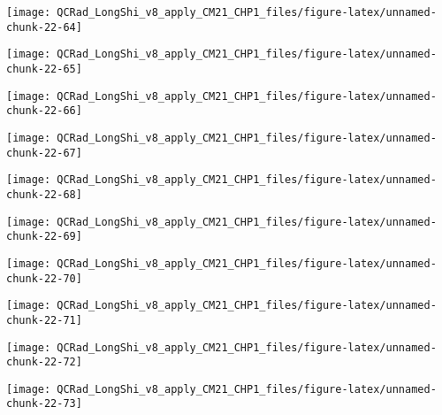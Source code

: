 \documentclass[
  10pt,
  a4paper,oneside]{article}
\begin{document}
\begin{center}\texttt{[image: QCRad\_LongShi\_v8\_apply\_CM21\_CHP1\_files/figure-latex/unnamed-chunk-22-64]} \end{center}

\begin{center}\texttt{[image: QCRad\_LongShi\_v8\_apply\_CM21\_CHP1\_files/figure-latex/unnamed-chunk-22-65]} \end{center}

\begin{center}\texttt{[image: QCRad\_LongShi\_v8\_apply\_CM21\_CHP1\_files/figure-latex/unnamed-chunk-22-66]} \end{center}

\begin{center}\texttt{[image: QCRad\_LongShi\_v8\_apply\_CM21\_CHP1\_files/figure-latex/unnamed-chunk-22-67]} \end{center}

\begin{center}\texttt{[image: QCRad\_LongShi\_v8\_apply\_CM21\_CHP1\_files/figure-latex/unnamed-chunk-22-68]} \end{center}

\begin{center}\texttt{[image: QCRad\_LongShi\_v8\_apply\_CM21\_CHP1\_files/figure-latex/unnamed-chunk-22-69]} \end{center}

\begin{center}\texttt{[image: QCRad\_LongShi\_v8\_apply\_CM21\_CHP1\_files/figure-latex/unnamed-chunk-22-70]} \end{center}

\begin{center}\texttt{[image: QCRad\_LongShi\_v8\_apply\_CM21\_CHP1\_files/figure-latex/unnamed-chunk-22-71]} \end{center}

\begin{center}\texttt{[image: QCRad\_LongShi\_v8\_apply\_CM21\_CHP1\_files/figure-latex/unnamed-chunk-22-72]} \end{center}

\begin{center}\texttt{[image: QCRad\_LongShi\_v8\_apply\_CM21\_CHP1\_files/figure-latex/unnamed-chunk-22-73]} \end{center}
\end{document}
